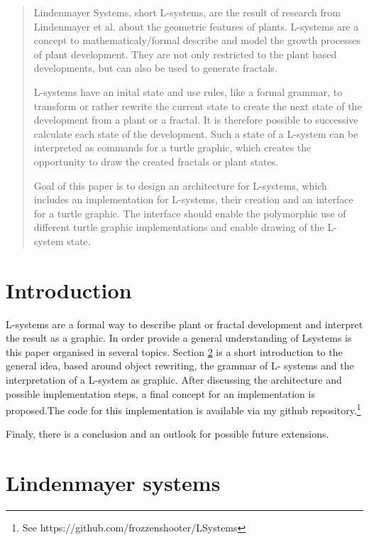 \documentclass[english]{cpp-hmwk}
\begin{document}

\begin{abstract}
Lindenmayer Systems, short L-systems, are the result of research from Lindenmayer et al.\cite{prusinkiewiczp.lindenmayera.2004} about the geometric features of plants.
L-systems are a concept to mathematicaly/formal describe and model the growth processes of plant development. They are not only restricted to the plant based developments, but can also be used to generate fractals.

L-systems have an inital state and use rules, like a formal grammar, to transform or rather rewrite the current state to create the next state of the development from a plant or a fractal.
It is therefore possible to successive calculate each state of the development.
Such a state of a L-system can be interpreted as commands for a turtle graphic, which creates the opportunity to draw the created fractals or plant states. 

Goal of this paper is to design an architecture for L-systems, which includes an implementation for L-systems, their creation and an interface for a turtle graphic. The interface should enable the polymorphic use of different turtle graphic implementations and enable drawing of the L-system state.
\end{abstract}

\pagebreak
\section{Introduction}
L-systems are a formal way to describe plant or fractal development and interpret the result as a graphic. In order provide a general understanding of Lsystems is this  paper organised in several topics. Section \ref{section:lindenmayer} is a short introduction to the general idea,  based around object rewriting, the grammar of L- systems and the interpretation of a L-system as graphic.
After discussing the architecture and possible implementation steps, a final concept for an implementation is proposed.The code for this implementation is available via my github repository.\footnote{See https://github.com/frozzenshooter/LSystems}

Finaly, there is a conclusion and an outlook for possible future extensions.

\section{Lindenmayer systems}
\label{section:lindenmayer}
\end{document}

